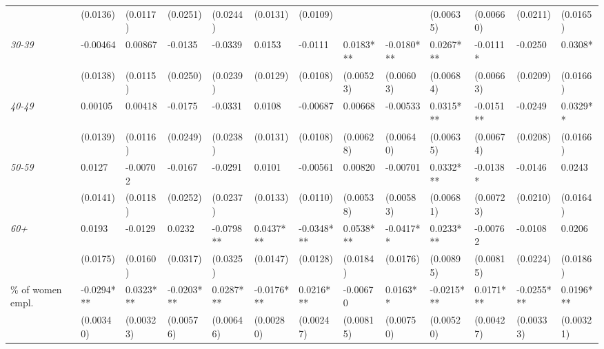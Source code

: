 \documentclass[12pt]{article}
\begin{document}
\begin{sidewaystable}[htb]
{\begin{threeparttable}
\begin{tabular}{l*{12}{l}}
                                &       (0.0136)    & (0.0117)    & (0.0251)     & (0.0244)   & (0.0131)   & (0.0109)    &             &            & (0.00635)  & (0.00660)  & (0.0211)     & (0.0165)   \\[1ex]
\quad \textit{30-39}            &       -0.00464    & 0.00867     & -0.0135      & -0.0339    & 0.0153     & -0.0111     & 0.0183***   & -0.0180*** & 0.0267***  & -0.0111*   & -0.0250      & 0.0308*    \\
                                &       (0.0138)    & (0.0115)    & (0.0250)     & (0.0239)   & (0.0129)   & (0.0108)    & (0.00523)   & (0.00603)  & (0.00684)  & (0.00663)  & (0.0209)     & (0.0166)   \\[1ex]
\quad \textit{40-49}            &       0.00105     & 0.00418     & -0.0175      & -0.0331    & 0.0108     & -0.00687    & 0.00668     & -0.00533   & 0.0315***  & -0.0151**  & -0.0249      & 0.0329**   \\
                                &       (0.0139)    & (0.0116)    & (0.0249)     & (0.0238)   & (0.0131)   & (0.0108)    & (0.00628)   & (0.00640)  & (0.00635)  & (0.00674)  & (0.0208)     & (0.0166)   \\[1ex]
\quad \textit{50-59}            &       0.0127      & -0.00702    & -0.0167      & -0.0291    & 0.0101     & -0.00561    & 0.00820     & -0.00701   & 0.0332***  & -0.0138*   & -0.0146      & 0.0243     \\
                                &       (0.0141)    & (0.0118)    & (0.0252)     & (0.0237)   & (0.0133)   & (0.0110)    & (0.00538)   & (0.00583)  & (0.00681)  & (0.00723)  & (0.0210)     & (0.0164)   \\[1ex]
\quad \textit{60+}              &       0.0193      & -0.0129     & 0.0232       & -0.0798**  & 0.0437***  & -0.0348***  & 0.0538***   & -0.0417**  & 0.0233***  & -0.00762   & -0.0108      & 0.0206     \\
                                &       (0.0175)    & (0.0160)    & (0.0317)     & (0.0325)   & (0.0147)   & (0.0128)    & (0.0184)    & (0.0176)   & (0.00895)  & (0.00815)  & (0.0224)     & (0.0186)   \\[1ex]
\% of women empl.               &       -0.0294***  & 0.0323***   & -0.0203***   & 0.0287***  & -0.0176*** & 0.0216***   & -0.00670    & 0.0163**   & -0.0215*** & 0.0171***  & -0.0255***   & 0.0196***  \\
                                &       (0.00340)   & (0.00323)   & (0.00576)    & (0.00646)  & (0.00280)  & (0.00247)   & (0.00815)   & (0.00750)  & (0.00520)  & (0.00427)  & (0.00333)    & (0.00321)  \\[1ex]

\end{tabular}
\end{threeparttable}}
\end{sidewaystable}
\end{document}
